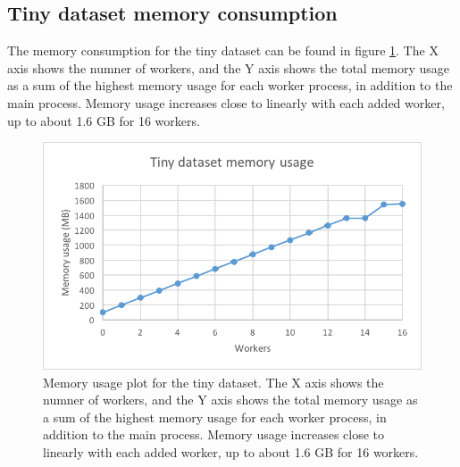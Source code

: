 \subsection{Tiny dataset memory consumption}
The memory consumption for the tiny dataset can be found in figure \ref{fig:dataset_1_memory}.
The X axis shows the numner of workers, and the Y axis shows the total memory usage as
a sum of the highest memory usage for each worker process, in addition to the main process. Memory usage increases close to linearly with each added worker,
up to about 1.6 GB for 16 workers.
\begin{figure}[ht]
  \centering
  \includegraphics[width=120mm]{figures/dataset_1/dataset_1_memory.png}
  \caption[Memory usage plot for the tiny dataset.]{Memory usage plot for the tiny dataset. The X axis shows the numner of workers, and the Y axis shows the total memory usage as
  a sum of the highest memory usage for each worker process, in addition to the main process. Memory usage increases close to linearly with each added worker,
  up to about 1.6 GB for 16 workers.}
  \label{fig:dataset_1_memory}
\end{figure}

